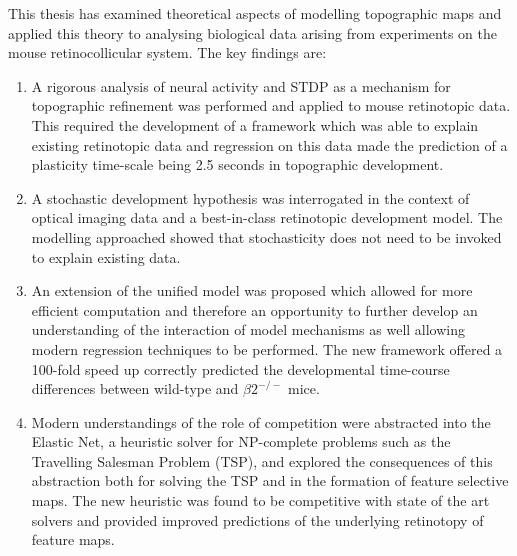 This thesis has examined theoretical aspects of modelling topographic maps and applied this theory to analysing biological data arising from experiments on the mouse retinocollicular system. The key findings are:
\begin{enumerate}
	\item A rigorous analysis of neural activity and STDP as a mechanism for topographic refinement was performed and applied to mouse retinotopic data. This required the development of a framework which was able to explain existing retinotopic data and regression on this data made the prediction of a plasticity time-scale being 2.5 seconds in topographic development.
	\item A stochastic development hypothesis was interrogated in the context of optical imaging data and a best-in-class retinotopic development model. The modelling approached showed that stochasticity does not need to be invoked to explain existing data.
	\item An extension of the unified model was proposed which allowed for more efficient computation and therefore an opportunity to further develop an understanding of the interaction of model mechanisms as well allowing modern regression techniques to be performed. The new framework offered a 100-fold speed up correctly predicted the developmental time-course differences between wild-type and $\beta2^{-/-}$ mice.
	\item Modern understandings of the role of competition were abstracted into the Elastic Net, a heuristic solver for NP-complete problems such as the Travelling Salesman Problem (TSP), and explored the consequences of this abstraction both for solving the TSP and in the formation of feature selective maps. The new heuristic was found to be competitive with state of the art solvers and provided improved predictions of the underlying retinotopy of feature maps.
\end{enumerate}

